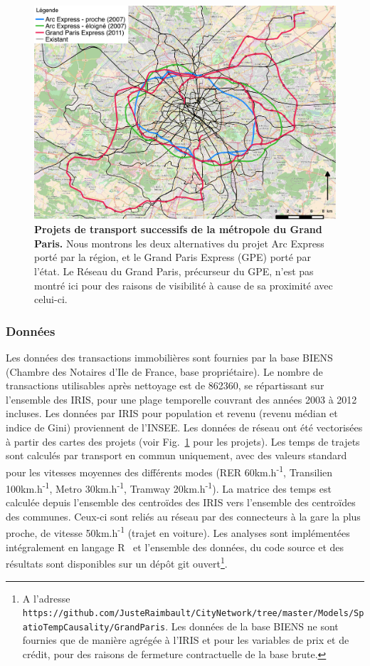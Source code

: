 \documentclass[english]{./sageo}
\begin{document}
\begin{figure}[h]
\centering
\includegraphics[width=12cm]{reseaux}
\caption{\textbf{Projets de transport successifs de la métropole du Grand Paris.} Nous montrons les deux alternatives du projet Arc Express porté par la région, et le Grand Paris Express (GPE) porté par l'état. Le Réseau du Grand Paris, précurseur du GPE, n'est pas montré ici pour des raisons de visibilité à cause de sa proximité avec celui-ci.}
\label{fig:projects}
\end{figure}

\subsubsection{Données}

Les données des transactions immobilières sont fournies par la base BIENS (Chambre des Notaires d'Ile de France, base propriétaire). Le nombre de transactions utilisables après nettoyage est de 862360, se répartissant sur l'ensemble des IRIS, pour une plage temporelle couvrant des années 2003 à 2012 incluses. Les données par IRIS pour population et revenu (revenu médian et indice de Gini) proviennent de l'INSEE. Les données de réseau ont été vectorisées à partir des cartes des projets (voir Fig.~\ref{fig:projects} pour les projets). Les temps de trajets sont calculés par transport en commun uniquement, avec des valeurs standard pour les vitesses moyennes des différents modes (RER 60km.h\textsuperscript{-1}, Transilien 100km.h\textsuperscript{-1}, Metro 30km.h\textsuperscript{-1}, Tramway 20km.h\textsuperscript{-1}). La matrice des temps est calculée depuis l'ensemble des centroïdes des IRIS vers l'ensemble des centroïdes des communes. Ceux-ci sont reliés au réseau par des connecteurs à la gare la plus proche, de vitesse 50km.h\textsuperscript{-1} (trajet en voiture). Les analyses sont implémentées intégralement en langage R~\cite{rcoreteam} et l'ensemble des données, du code source et des résultats sont disponibles sur un dépôt git ouvert\footnote{A l'adresse\\\texttt{https://github.com/JusteRaimbault/CityNetwork/tree/master/Models/SpatioTempCausality/GrandParis}. Les données de la base BIENS ne sont fournies que de manière agrégée à l'IRIS et pour les variables de prix et de crédit, pour des raisons de fermeture contractuelle de la base brute.}.
\end{document}
